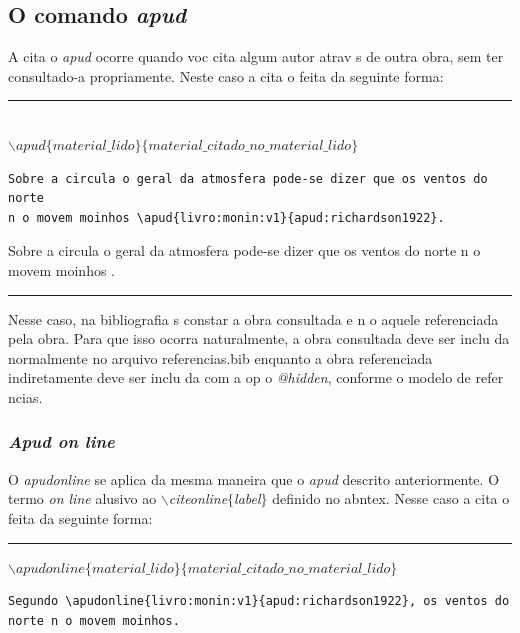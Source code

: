 \documentclass{article}
\begin{document}
  \subsection{O comando \textit{apud}}
  \par A cita o \textit{apud} ocorre quando voc  cita algum autor atrav s de outra obra, sem ter consultado-a propriamente. Neste caso a cita o   feita da seguinte forma:
  \begin{center}
  \rule{0.5\textwidth}{1pt}\\
  $\backslash apud\{material\_lido\}\{material\_citado\_no\_material\_lido\}$ \\
  \end{center}
\begin{verbatim}
Sobre a circula o geral da atmosfera pode-se dizer que os ventos do norte
n o movem moinhos \apud{livro:monin:v1}{apud:richardson1922}.
\end{verbatim}
  
  Sobre a circula o geral da atmosfera pode-se dizer que os ventos do norte n o movem moinhos .
\begin{center}\rule{0.5\textwidth}{1pt}\end{center}  
  \par Nesse caso, na bibliografia s  constar  a obra consultada e n o aquele referenciada pela obra. Para que isso ocorra naturalmente, a obra consultada deve ser inclu da normalmente no arquivo referencias.bib enquanto a obra referenciada indiretamente deve ser inclu da com a op o \textit{@hidden}, conforme o modelo de refer ncias.

      \subsubsection{\textit{Apud on line}}
      
      \par O \textit{apudonline} se aplica da mesma maneira que o \textit{apud} descrito anteriormente. O termo \textit{on line}   alusivo ao \textit{$\backslash$citeonline$\{$label$\}$} definido no abntex. Nesse caso a cita o   feita da seguinte forma:
      \begin{center}
      \rule{0.5\textwidth}{1pt}
            $\backslash apudonline\{material\_lido\}\{material\_citado\_no\_material\_lido\}$ \\
	    \end{center}

 \begin{verbatim}
Segundo \apudonline{livro:monin:v1}{apud:richardson1922}, os ventos do
norte n o movem moinhos.
\end{verbatim}
\end{document}
